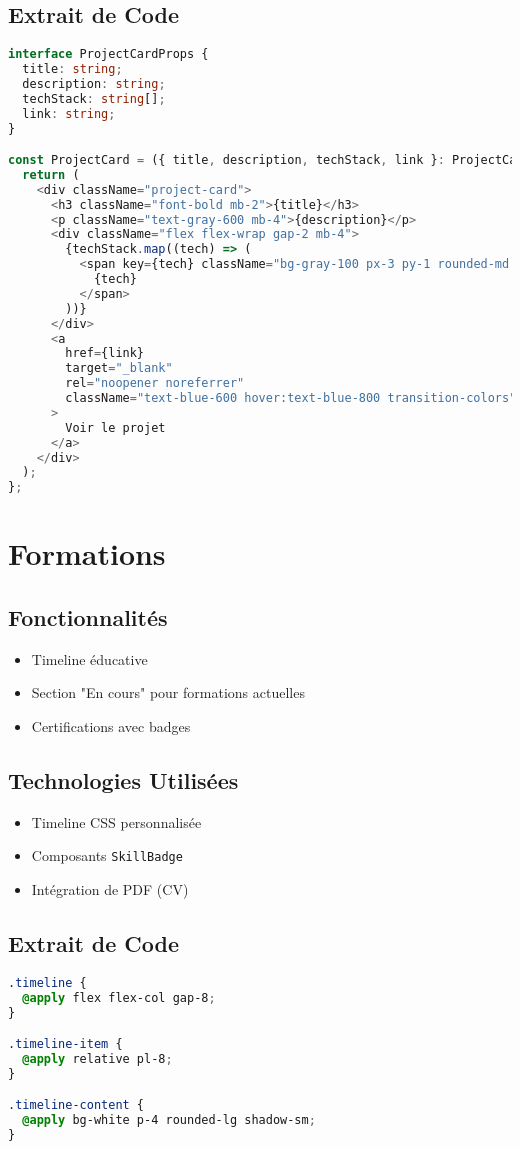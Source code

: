 \documentclass[12pt,a4paper]{report}
\begin{document}
\subsection{Extrait de Code}
\begin{lstlisting}[language=TypeScript,caption=Composant ProjectCard]
interface ProjectCardProps {
  title: string;
  description: string;
  techStack: string[];
  link: string;
}

const ProjectCard = ({ title, description, techStack, link }: ProjectCardProps) => {
  return (
    <div className="project-card">
      <h3 className="font-bold mb-2">{title}</h3>
      <p className="text-gray-600 mb-4">{description}</p>
      <div className="flex flex-wrap gap-2 mb-4">
        {techStack.map((tech) => (
          <span key={tech} className="bg-gray-100 px-3 py-1 rounded-md text-sm">
            {tech}
          </span>
        ))}
      </div>
      <a 
        href={link} 
        target="_blank" 
        rel="noopener noreferrer"
        className="text-blue-600 hover:text-blue-800 transition-colors"
      >
        Voir le projet
      </a>
    </div>
  );
};
\end{lstlisting}

\section{Formations}
\subsection{Fonctionnalités}
\begin{itemize}
\item Timeline éducative
\item Section "En cours" pour formations actuelles
\item Certifications avec badges
\end{itemize}

\subsection{Technologies Utilisées}
\begin{itemize}
\item Timeline CSS personnalisée
\item Composants \texttt{SkillBadge}
\item Intégration de PDF (CV)
\end{itemize}

\subsection{Extrait de Code}
\begin{lstlisting}[language=CSS,caption=Timeline CSS]
.timeline {
  @apply flex flex-col gap-8;
}

.timeline-item {
  @apply relative pl-8;
}

.timeline-content {
  @apply bg-white p-4 rounded-lg shadow-sm;
}
\end{lstlisting}
\end{document}
